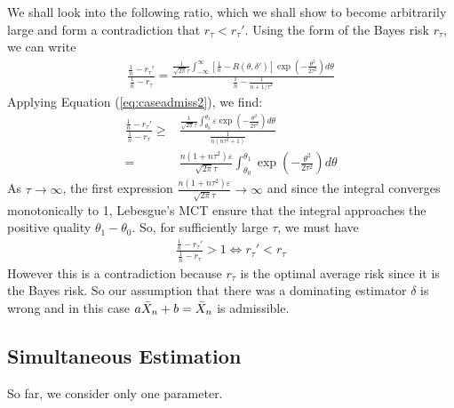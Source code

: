 \begin{example}
\begin{enumerate}[{Case} 1]
        We shall look into the following ratio,
        which we shall show to become arbitrarily large and form a contradiction that $r_\tau<r_\tau'$.
        Using the form of the Bayes risk $r_\tau$, we can write
        \begin{gather}
            \frac{\frac{1}{n}-r_\tau'}
            {\frac{1}{n}-r_\tau}
            =
            \frac{\frac{1}{\sqrt{2\pi}\tau}
            \int_{-\infty}^\infty{
                \left[\frac{1}{n}-R(\theta,\delta')\right]\exp\left(-\frac{\theta^2}{2\tau^2}\right)
            }d\theta}
            {\frac{1}{n}-\frac{1}{n+1/\tau^2}}
        \end{gather}
        Applying Equation (\ref{eq:caseadmiss2}), we find:
        \begin{align}
            \frac{\frac{1}{n}-r_\tau'}{\frac{1}{n}-r_\tau}
            \geq& \frac{\frac{1}{\sqrt{2\pi}\tau}\int_{\theta_0}^{\theta_1}{
                \varepsilon\exp\left(-\frac{\theta^2}{2\tau^2}\right)
            }d\theta}
            {\frac{1}{n(n\tau^2+1)}}\\
            =& \frac{n(1+n\tau^2)\varepsilon}{\sqrt{2\pi}\tau}\int_{\theta_0}^{\theta_1}{
                \exp\left(-\frac{\theta^2}{2\tau^2}\right)
            }d\theta
        \end{align}
        As $\tau\to\infty$, the first expression $\frac{n(1+n\tau^2)\varepsilon}{\sqrt{2\pi}\tau}\to\infty$
        and since the integral converges monotonically to 1, 
        Lebesgue's MCT ensure that the integral approaches the positive quality $\theta_1-\theta_0$.
        So, for sufficiently large $\tau$, we must have 
        \begin{gather}
            \frac{\frac{1}{n}-r_\tau'}{\frac{1}{n}-r_\tau}
            > 1
            \iff 
            r_\tau'<r_\tau
        \end{gather}
        However this is a contradiction because $r_\tau$ is the optimal average risk
        since it is the Bayes risk.
        So our assumption that there was a dominating estimator $\delta$ is wrong
        and in this case $a\Bar{X}_n+b=\Bar{X}_n$ is admissible.
    \end{enumerate}
\end{example}

\subsection{Simultaneous Estimation}

So far, we consider only one parameter.

